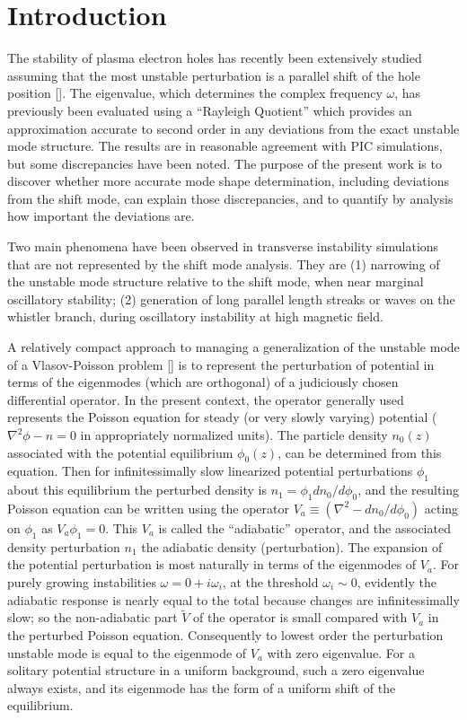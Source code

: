 \documentclass[12pt]{article}
\begin{document}
\section{Introduction}

The stability of plasma electron holes has recently been extensively studied
assuming that the most unstable perturbation is a parallel shift of
the hole position []. The eigenvalue, which determines the complex
frequency $\omega$, has previously been evaluated using a ``Rayleigh
Quotient'' which provides an approximation accurate to second order in
any deviations from the exact unstable mode structure. The results are
in reasonable agreement with PIC simulations, but some discrepancies
have been noted. The purpose of the present work is to discover
whether more accurate mode shape determination, including deviations
from the shift mode, can explain those discrepancies, and to quantify
by analysis how important the deviations are.

Two main phenomena have been observed in transverse instability
simulations that are not represented by the shift mode analysis. They
are (1) narrowing of the unstable mode structure relative to the shift
mode, when near marginal oscillatory stability; (2) generation of long
parallel length streaks or waves on the whistler branch, during
oscillatory instability at high magnetic field.

A relatively compact approach to managing a generalization of the
unstable mode of a Vlasov-Poisson problem [] is to represent the
perturbation of potential in terms of the eigenmodes (which are
orthogonal) of a judiciously chosen differential operator. In the
present context, the operator generally used represents the Poisson
equation for steady (or very slowly varying) potential
($\nabla^2\phi-n=0$ in appropriately normalized units). The particle
density $n_0(z)$ associated with the potential equilibrium
$\phi_0(z)$, can be determined from this equation. Then for
infinitessimally slow linearized potential perturbations $\phi_1$
about this equilibrium the perturbed density is
$n_1=\phi_1dn_0/d\phi_0$, and the resulting Poisson equation can be
written using the operator $V_a \equiv(\nabla^2-dn_0/d\phi_0)$ acting on
$\phi_1$ as $V_a\phi_1=0$. This $V_a$ is called the ``adiabatic''
operator, and the associated density perturbation $n_1$ the adiabatic
density (perturbation). The expansion of the potential perturbation is
most naturally in terms of the eigenmodes of $V_a$. For purely growing
instabilities $\omega=0+i\omega_i$, at the threshold $\omega_i\sim 0$,
evidently the adiabatic response is nearly equal to the total because
changes are infinitessimally slow; so the non-adiabatic part
$\tilde V$ of the operator is small compared with $V_a$ in the
perturbed Poisson equation. Consequently to lowest order the
perturbation unstable mode is equal to the eigenmode of $V_a$ with
zero eigenvalue. For a solitary potential structure in a uniform
background, such a zero eigenvalue always exists, and its eigenmode
has the form of a uniform shift of the equilibrium.
\end{document}
